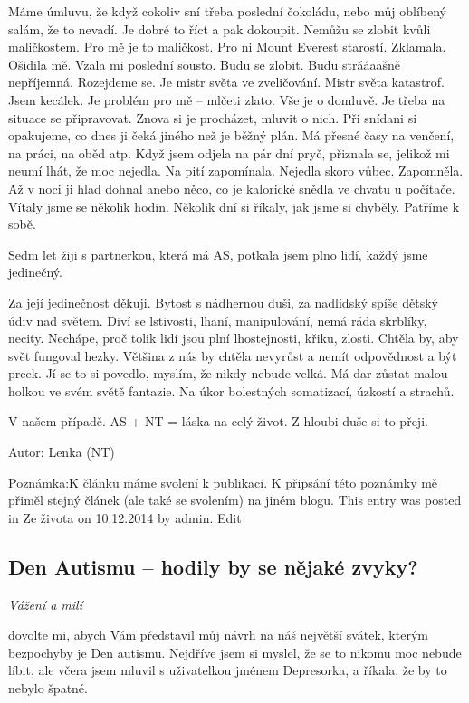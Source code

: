 \documentclass[DIV=calc, paper=a4, fontsize=11pt, twocolumn]{scrartcl}	 %
\begin{document}
Máme úmluvu, že když cokoliv sní třeba poslední čokoládu, nebo můj
oblíbený salám, že to nevadí. Je dobré to říct a pak dokoupit. Nemůžu
se zlobit kvůli maličkostem. Pro mě je to maličkost. Pro ni Mount
Everest starostí. Zklamala. Ošidila mě. Vzala mi poslední sousto. Budu
se zlobit. Budu strááaašně nepříjemná. Rozejdeme se. Je mistr světa ve
zveličování. Mistr světa katastrof.  Jsem kecálek. Je problém pro mě –
mlčeti zlato.  Vše je o domluvě. Je třeba na situace se
připravovat. Znova si je procházet, mluvit o nich. Při snídani si
opakujeme, co dnes ji čeká jiného než je běžný plán. Má přesné časy na
venčení, na práci, na oběd atp. Když jsem odjela na pár dní pryč,
přiznala se, jelikož mi neumí lhát, že moc nejedla. Na pití
zapomínala. Nejedla skoro vůbec. Zapomněla. Až v noci ji hlad dohnal
anebo něco, co je kalorické snědla ve chvatu u počítače. Vítaly jsme
se několik hodin. Několik dní si říkaly, jak jsme si chyběly. Patříme
k sobě.

Sedm let žiji s partnerkou, která má AS, potkala jsem plno lidí, každý
jsme jedinečný.

Za její jedinečnost děkuji.  Bytost s  nádhernou duši, za nadlidský
spíše dětský údiv nad světem. Diví se lstivosti, lhaní, manipulování,
nemá ráda skrblíky, necity. Nechápe, proč tolik lidí jsou plní
lhostejnosti, křiku, zlosti. Chtěla by, aby svět fungoval
hezky. Většina z nás by chtěla nevyrůst a nemít odpovědnost a být
prcek. Jí se to si povedlo, myslím, že nikdy nebude velká. Má dar
zůstat malou holkou ve svém světě fantazie. Na úkor bolestných
somatizací, úzkostí a strachů.

V našem případě. AS + NT = láska na celý život. Z hloubi duše si to
přeji.

Autor: Lenka (NT)

Poznámka:K článku máme svolení k publikaci. K připsání této poznámky
mě přiměl stejný článek (ale také se svolením) na jiném blogu. 
This entry was posted in Ze života on 10.12.2014 by admin. Edit

\subsection*{Den Autismu – hodily by se nějaké zvyky?}

{\it Vážení a milí}

dovolte mi, abych Vám představil můj návrh na náš největší svátek,
kterým bezpochyby je Den autismu. Nejdříve jsem si myslel, že se to
nikomu moc nebude líbit, ale včera jsem mluvil s uživatelkou jménem
Depresorka, a říkala, že by to nebylo špatné.
\end{document}
